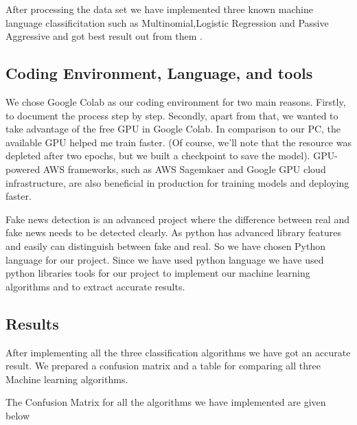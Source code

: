 \documentclass[conference]{IEEEtran}
\begin{document}
\vspace{12pt}


After processing the data set we have implemented three known machine language classificitation such as Multinomial,Logistic Regression and  Passive Aggressive and  got best result out from them .



\subsection{Coding Environment, Language, and tools}

We chose Google Colab as our coding environment for two main reasons. Firstly, to document the process step by step. Secondly, apart from that, we wanted to take advantage of the free GPU in Google Colab. In comparison to our PC, the available GPU helped me train faster. (Of course, we'll note that the resource was depleted after two epochs, but we built a checkpoint to save the model). GPU-powered AWS frameworks, such as AWS Sagemkaer and Google GPU cloud infrastructure, are also beneficial in production for training models and deploying faster. 



Fake news detection is an advanced project where the difference between real and fake news needs to be detected clearly. As python has advanced library features and easily can distinguish between fake and real. So we have chosen Python language for our project.
Since we have used python language we have used python libraries tools for our project to implement our machine learning algorithms and to extract accurate results.


\subsection{Results}

After implementing all the three classification algorithms we have got an accurate result. We prepared a confusion matrix and a table for comparing all three Machine learning algorithms. 



The Confusion Matrix for all the algorithms we have implemented are given below
\end{document}
